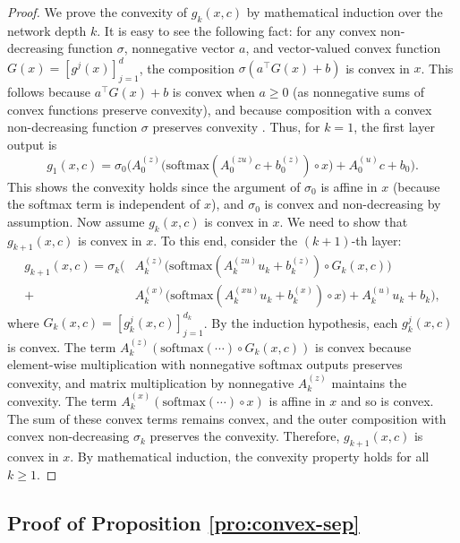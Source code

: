 \documentclass[journal]{IEEEtran}
\begin{document}
{\begin{proof}
	We prove the convexity of $g_k(x, c)$ by mathematical induction over the network depth $k$. It is easy to see the following fact: for any convex non-decreasing function $\sigma$, nonnegative vector $a$, and vector-valued convex function $G(x) = [g^j(x)]_{j=1}^d$, the composition $\sigma(a^\top G(x) + b)$ is convex in $x$. This follows because $a^\top G(x) + b$ is convex when $a \geq 0$ (as nonnegative sums of convex functions preserve convexity), and because composition with a convex non-decreasing function $\sigma$ preserves convexity \cite{boyd2004convex}. Thus, for $k=1$, the first layer output is  
	\begin{equation*}
		g_1(x, c) = \sigma_0\Big( A_0^{(z)} \big( \mathrm{softmax}(A_0^{(zu)} c + b_0^{(z)}) \circ x \big) + A_0^{(u)} c + b_0 \Big).
	\end{equation*}
   This shows the convexity holds since the argument of $\sigma_0$ is affine in $x$ (because the softmax term is independent of $x$), and $\sigma_0$ is convex and non-decreasing by assumption. Now assume $g_k(x, c)$ is convex in $x$. We need to show that $g_{k+1}(x, c)$ is convex in $x$. To this end, consider the $(k+1)$-th layer:
	\begin{align*}
		g_{k+1}(x, c) = \sigma_k\Big( & A_k^{(z)} \big( \mathrm{softmax}(A_k^{(zu)} u_k + b_k^{(z)}) \circ G_k(x, c) \big) \nonumber \\
		+ & A_k^{(x)} \big( \mathrm{softmax}(A_k^{(xu)} u_k + b_k^{(x)}) \circ x \big) + A_k^{(u)} u_k + b_k \Big),
	\end{align*}
	where $G_k(x, c) = [g_k^j(x, c)]_{j=1}^{d_k}$. By the induction hypothesis, each $g_k^j(x, c)$ is convex. The term $A_k^{(z)} (\mathrm{softmax}(\cdots) \circ G_k(x, c))$ is convex because element-wise multiplication with nonnegative softmax outputs preserves convexity, and matrix multiplication by nonnegative $A_k^{(z)}$ maintains the convexity. The term $A_k^{(x)} (\mathrm{softmax}(\cdots) \circ x)$ is affine in $x$ and so is convex. The sum of these convex terms remains convex, and the outer composition with convex non-decreasing $\sigma_k$ preserves the convexity. Therefore, $g_{k+1}(x, c)$ is convex in $x$. By mathematical induction, the convexity property holds for all $k \geq 1$.
\end{proof}





\subsection{Proof of Proposition \ref{pro:convex-sep}}
\label{app:pro2}

}
\end{document}
